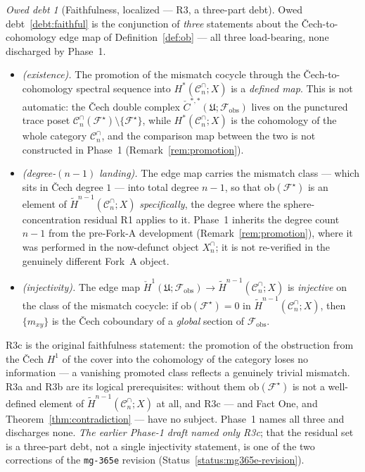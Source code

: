 \documentclass[11pt,oneside]{amsart}
\theoremstyle{plain}
\theoremstyle{definition}
\theoremstyle{remark}
\theoremstyle{honeststyle}
\newtheorem{debt}[theorem]{Owed debt}
\newcommand{\F}{\mathcal{F}}
\newcommand{\Fstar}{\F^{\star}}
\newcommand{\Cn}{\mathcal{C}^{\cap}_n}
\newcommand{\ob}{\mathrm{ob}}
\newcommand{\fobs}{\mathcal{F}_{\mathrm{obs}}}
\begin{document}
\begin{debt}[Faithfulness, localized --- R3, a three-part debt]
\label{debt:faithful-localized}
Owed debt~\ref{debt:faithful} is the conjunction of \emph{three}
statements about the \v{C}ech-to-cohomology edge map of
Definition~\ref{def:ob} --- all three load-bearing, none discharged by
Phase~1.
\begin{itemize}[leftmargin=1.7em]
\item[\textbf{R3a}] \emph{(existence).} The promotion of the mismatch
  cocycle through the \v{C}ech-to-cohomology spectral sequence into
  $H^{*}(\Cn;X)$ is a \emph{defined map}. This is not automatic: the
  \v{C}ech double complex $\check C^{*,*}(\mathfrak U;\fobs)$ lives on
  the punctured trace poset $\Cn(\Fstar)\setminus\{\Fstar\}$, while
  $H^{*}(\Cn;X)$ is the cohomology of the whole category $\Cn$, and
  the comparison map between the two is not constructed in Phase~1
  (Remark~\ref{rem:promotion}).
\item[\textbf{R3b}] \emph{(degree-$(n-1)$ landing).} The edge map
  carries the mismatch class --- which sits in \v{C}ech degree $1$ ---
  into total degree $n-1$, so that $\ob(\Fstar)$ is an element of
  $\widetilde H^{n-1}(\Cn;X)$ \emph{specifically}, the degree where
  the sphere-concentration residual R1 applies to it. Phase~1 inherits
  the degree count $n-1$ from the pre-Fork-A development
  (Remark~\ref{rem:promotion}), where it was performed in the
  now-defunct object $X^{\cap}_n$; it is not re-verified in the
  genuinely different Fork~A object.
\item[\textbf{R3c}] \emph{(injectivity).} The edge map $\check
  H^{1}(\mathfrak U;\fobs)\to\widetilde H^{n-1}(\Cn;X)$ is
  \emph{injective} on the class of the mismatch cocycle: if
  $\ob(\Fstar)=0$ in $\widetilde H^{n-1}(\Cn;X)$, then $\{m_{xy}\}$ is
  the \v{C}ech coboundary of a \emph{global} section of $\fobs$.
\end{itemize}
R3c is the original faithfulness statement: the promotion of the
obstruction from the \v{C}ech $H^1$ of the cover into the cohomology
of the category loses no information --- a vanishing promoted class
reflects a genuinely trivial mismatch. R3a and R3b are its logical
prerequisites: without them $\ob(\Fstar)$ is not a well-defined
element of $\widetilde H^{n-1}(\Cn;X)$ at all, and R3c --- and Fact
One, and Theorem~\ref{thm:contradiction} --- have no subject. Phase~1
names all three and discharges none. \emph{The earlier Phase-1 draft
named only R3c}; that the residual set is a three-part debt, not a
single injectivity statement, is one of the two corrections of the
\texttt{mg-365e} revision (Status~\ref{status:mg365e-revision}).
\end{debt}
\end{document}
